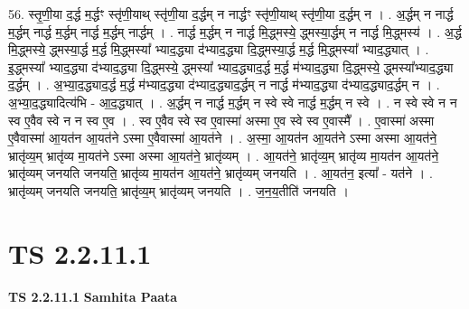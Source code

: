\documentclass[17pt]{extarticle}
\begin{document}
56. स्तृ॒णी॒या द॒र्द्ध म॒र्द्धꣳ स्तृ॑णी॒याथ् स्तृ॑णी॒या द॒र्द्धम् न नार्द्धꣳ स्तृ॑णी॒याथ् स्तृ॑णी॒या द॒र्द्धम् न । . अ॒र्द्धम् न नार्द्ध म॒र्द्धम् नार्द्ध म॒र्द्धम् नार्द्ध म॒र्द्धम् नार्द्धम् । . नार्द्ध म॒र्द्धम् न नार्द्ध मि॒द्ध्मस्ये॒ द्ध्मस्या॒र्द्धम् न नार्द्ध मि॒द्ध्मस्य॑ । . अ॒र्द्ध मि॒द्ध्मस्ये॒ द्ध्मस्या॒र्द्ध म॒र्द्ध मि॒द्ध्मस्या᳚ भ्याद॒द्ध्या द॑भ्याद॒द्ध्या दि॒द्ध्मस्या॒र्द्ध म॒र्द्ध मि॒द्ध्मस्या᳚ भ्याद॒द्ध्यात् । . इ॒द्ध्मस्या᳚ भ्याद॒द्ध्या द॑भ्याद॒द्ध्या दि॒द्ध्मस्ये॒ द्ध्मस्या᳚ भ्याद॒द्ध्याद॒र्द्ध म॒र्द्ध म॑भ्याद॒द्ध्या दि॒द्ध्मस्ये॒ द्ध्मस्या᳚भ्याद॒द्ध्या द॒र्द्धम् । . अ॒भ्या॒द॒द्ध्याद॒र्द्ध म॒र्द्ध म॑भ्याद॒द्ध्या द॑भ्याद॒द्ध्याद॒र्द्धम् न नार्द्ध म॑भ्याद॒द्ध्या 
द॑भ्याद॒द्ध्याद॒र्द्धम् न । . अ॒भ्या॒द॒द्ध्यादित्य॑भि - आ॒द॒द्ध्यात् । . अ॒र्द्धम् न नार्द्ध म॒र्द्धम् न स्वे स्वे नार्द्ध म॒र्द्धम् न स्वे । . न स्वे स्वे न न स्व ए॒वैव स्वे न न स्व ए॒व । . स्व ए॒वैव स्वे स्व ए॒वास्मा॑ अस्मा ए॒व स्वे स्व ए॒वास्मै᳚ । . ए॒वास्मा॑ अस्मा ए॒वैवास्मा॑ आ॒यत॑न आ॒यत॑ने ऽस्मा ए॒वैवास्मा॑ आ॒यत॑ने । . अ॒स्मा॒ आ॒यत॑न आ॒यत॑ने ऽस्मा अस्मा आ॒यत॑ने॒ भ्रातृ॑व्य॒म् भ्रातृ॑व्य मा॒यत॑ने ऽस्मा अस्मा आ॒यत॑ने॒ भ्रातृ॑व्यम् । . आ॒यत॑ने॒ भ्रातृ॑व्य॒म् भ्रातृ॑व्य मा॒यत॑न आ॒यत॑ने॒ भ्रातृ॑व्यम् जनयति जनयति॒ भ्रातृ॑व्य मा॒यत॑न आ॒यत॑ने॒ भ्रातृ॑व्यम् जनयति । . आ॒यत॑न॒ इत्या᳚ - यत॑ने । . भ्रातृ॑व्यम् जनयति जनयति॒ भ्रातृ॑व्य॒म् भ्रातृ॑व्यम् जनयति । . ज॒न॒य॒तीति॑ जनयति । \newline
\pagebreak
{}
\section*{ TS 2.2.11.1 }

\textbf{TS 2.2.11.1 } \newline
\textbf{Samhita Paata} \newline
\end{document}
